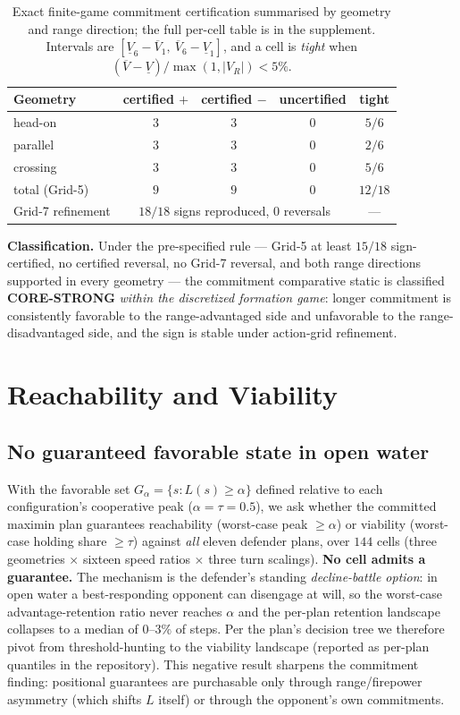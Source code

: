 \documentclass[12pt,a4paper]{article}
\begin{document}
\begin{table}[!htb]
\centering\small
\caption{Exact finite-game commitment certification summarised by geometry
and range direction; the full per-cell table is in the supplement.  Intervals
are $[\underline V_6-\overline V_1,\ \overline V_6-\underline V_1]$, and a cell
is \emph{tight} when $(\overline V-\underline V)/\max(1,|V_R|)<5\%$.}
\label{tab:cert}
\begin{tabular}{lcccc}
\toprule
Geometry & certified $+$ & certified $-$ & uncertified & tight \\
\midrule
head-on  & $3$ & $3$ & $0$ & $5/6$ \\
parallel & $3$ & $3$ & $0$ & $2/6$ \\
crossing & $3$ & $3$ & $0$ & $5/6$ \\
\midrule
total (Grid-5) & $9$ & $9$ & $0$ & $12/18$ \\
Grid-7 refinement & \multicolumn{3}{c}{$18/18$ signs reproduced, $0$ reversals} & --- \\
\bottomrule
\end{tabular}
\end{table}

\noindent\textbf{Classification.}  Under the pre-specified rule ---
Grid-5 at least $15/18$ sign-certified, no certified reversal, no
Grid-7 reversal, and both range directions supported in every geometry ---
the commitment comparative static is classified \textbf{CORE-STRONG}
\emph{within the discretized formation game}:
longer commitment is consistently favorable to the range-advantaged side
and unfavorable to the range-disadvantaged side, and the sign is stable
under action-grid refinement.

\section{Reachability and Viability}\label{sec:reachability}

\subsection{No guaranteed favorable state in open water}
With the favorable set $G_\alpha=\{s: L(s)\ge\alpha\}$ defined relative to
each configuration's cooperative peak ($\alpha=\tau=0.5$), we ask whether
the committed maximin plan guarantees reachability (worst-case peak
$\ge\alpha$) or viability (worst-case holding share $\ge\tau$) against
\emph{all} eleven defender plans, over $144$ cells (three geometries
$\times$ sixteen speed ratios $\times$ three turn scalings).
\textbf{No cell admits a guarantee.}  The mechanism is the defender's
standing \emph{decline-battle option}: in open water a best-responding opponent
can disengage at will, so the worst-case advantage-retention ratio never
reaches $\alpha$ and the per-plan retention landscape collapses to a
median of $0$--$3\%$ of steps.  Per the plan's decision tree we therefore
pivot from threshold-hunting to the viability landscape (reported as
per-plan quantiles in the repository).  This negative result sharpens the
commitment finding: positional guarantees are purchasable only through
range/firepower asymmetry (which shifts $L$ itself) or through the
opponent's own commitments.
\end{document}
